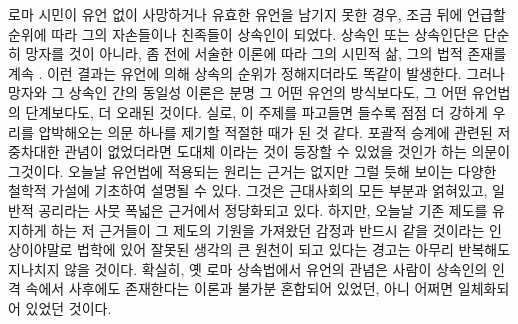 로마 시민이 유언 없이 사망하거나 유효한 유언을 남기지 못한 경우,
조금 뒤에 언급할 순위에 따라 그의 자손들이나 친족들이 상속인이 되었다.
상속인 또는 상속인단은 단순히 망자를  것이 아니라,
좀 전에 서술한 이론에 따라 그의 시민적 삶, 그의 법적 존재를 계속
.
이런 결과는 유언에 의해 상속의 순위가 정해지더라도 똑같이 발생한다.
그러나 망자와 그 상속인 간의 동일성 이론은 분명 그 어떤 유언의 방식보다도,
그 어떤 유언법의 단계보다도, 더 오래된 것이다.
실로, 이 주제를 파고들면 들수록 점점 더 강하게 우리를 압박해오는
의문 하나를 제기할 적절한 때가 된 것 같다.
포괄적 승계에 관련된 저 중차대한 관념이 없었더라면 도대체
이라는 것이 등장할 수 있었을 것인가 하는 의문이 그것이다.
오늘날 유언법에 적용되는 원리는
근거는 없지만 그럴 듯해 보이는 다양한 철학적 가설에 기초하여 설명될 수 있다.
그것은 근대사회의 모든 부분과 얽혀있고, 일반적 공리라는
사뭇 폭넓은 근거에서 정당화되고 있다.
하지만,
오늘날
기존 제도를 유지하게 하는 저 근거들이
그 제도의 기원을 가져왔던 감정과 반드시 같을 것이라는
인상이야말로
법학에 있어 잘못된 생각의 큰 원천이 되고 있다는
경고는 아무리 반복해도 지나치지 않을 것이다.
확실히,
옛 로마 상속법에서 유언의 관념은
사람이 상속인의 인격 속에서 사후에도 존재한다는 이론과
불가분 혼합되어 있었던, 아니 어쩌면 일체화되어 있었던 것이다.

